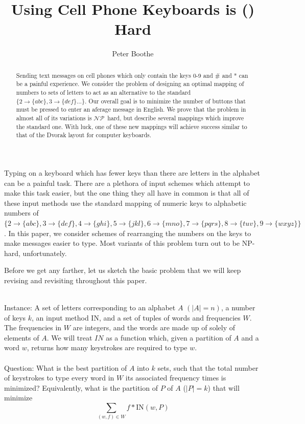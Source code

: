\documentclass[runningheads]{llncs}
\title{Using Cell Phone Keyboards is (\NP) Hard}
\author{Peter Boothe}
\institute{Manhattan College\\
\email{peter.boothe@manhattan.edu}
}
\newcommand{\NP}{\ensuremath{\mathcal{NP}}}
\begin{document}
\maketitle

\begin{abstract}
Sending text messages on cell phones which only contain the keys 0-9 and \# and
* can be a painful experience.  We consider the problem of designing an optimal
mapping of numbers to sets of letters to act as an alternative to the standard
$\{2\to\{abc\}, 3\to\{def\}\ldots\}$.  Our overall goal is to minimize the
number of buttons that must be pressed to enter an aferage message in English.
We prove that the problem in almost all of its variations is \NP\ hard, but
describe several mappings which improve the standard one.  With luck, one of
these new mappings will achieve success similar to that of the Dvorak layout
for computer keyboards.
\end{abstract}

Typing on a keyboard which has fewer keys than there are letters in the
alphabet can be a painful task.  There are a plethora of input schemes which
attempt to make this task easier, but the one thing they all have in common is
that all of these input methods use the standard mapping of numeric keys to
alphabetic numbers of 
$\{2\to\{abc\},
         3\to\{def\}, 4\to\{ghi\}, 5\to\{jkl\}, 6\to\{mno\}, 7\to\{pqrs\},
         8\to\{tuv\}, 9\to\{wxyz\}\}$.
In this paper, we consider schemes of rearranging the numbers on the keys to
make messages easier to type.  Most variants of this problem turn out to be
NP-hard, unfortunately.

Before we get any farther, let us sketch the basic problem that we will keep
revising and revisiting throughout this paper.
\begin{prob}[{\sc MinimumKeystrokes}]~\\
{\sc Instance}: A set of letters corresponding to an alphabet $A$ $(|A| =
n)$, a number of keys $k$, an input method $\mathrm{IN}$, and a set of
tuples of words and frequencies $W$.  The frequencies in $W$ are integers,
and the words are made up of solely of elements of $A$.  We will
treat $IN$ as a function which, given a partition of $A$ and a word
$w$, returns how many keystrokes are required to type $w$.~\\
        ~\\
{\sc Question}: What is the best partition of $A$ into $k$ sets, such that the
total number of keystrokes to type every word in $W$ its associated frequency
times is minimized?  Equivalently, what is the partition of $P$ of $A$ ($|P| = k$) that
will minimize
$$\sum_{(w,f)\in W} f*\mathrm{IN}(w,P)$$
\label{probtemplate}
\end{prob}
\end{document}
